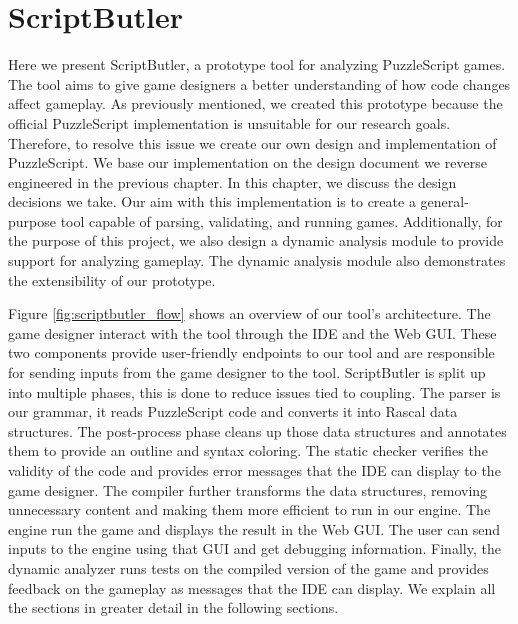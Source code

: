 \chapter{ScriptButler}
\label{ch:research}
Here we present ScriptButler, a prototype tool for analyzing PuzzleScript games. The tool aims to give game designers a better understanding of how code changes affect gameplay. As previously mentioned, we created this prototype because the official PuzzleScript implementation is unsuitable for our research goals. Therefore, to resolve this issue we create our own design and implementation of PuzzleScript. We base our implementation on the design document we reverse engineered in the previous chapter. In this chapter, we discuss the design decisions we take. Our aim with this implementation is to create a general-purpose tool capable of parsing, validating, and running games. Additionally, for the purpose of this project, we also design a dynamic analysis module to provide support for analyzing gameplay. The dynamic analysis module also demonstrates the extensibility of our prototype.

Figure \ref{fig:scriptbutler_flow} shows an overview of our tool's architecture. The game designer interact with the tool through the IDE and the Web GUI. These two components provide user-friendly endpoints to our tool and are responsible for sending inputs from the game designer to the tool. ScriptButler is split up into multiple phases, this is done to reduce issues tied to coupling. The parser is our grammar, it reads PuzzleScript code and converts it into Rascal data structures. The post-process phase cleans up those data structures and annotates them to provide an outline and syntax coloring. The static checker verifies the validity of the code and provides error messages that the IDE can display to the game designer. The compiler further transforms the data structures, removing unnecessary content and making them more efficient to run in our engine. The engine run the game and displays the result in the Web GUI. The user can send inputs to the engine using that GUI and get debugging information. Finally, the dynamic analyzer runs tests on the compiled version of the game and provides feedback on the gameplay as messages that the IDE can display. We explain all the sections in greater detail in the following sections. 

